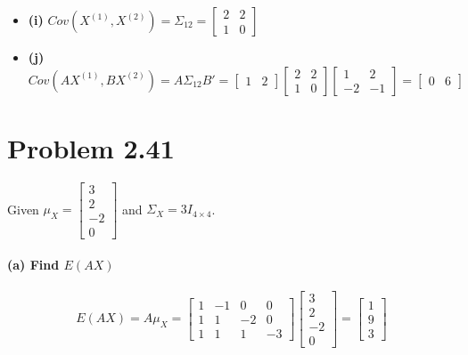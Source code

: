 \documentclass[12pt]{article}
\begin{document}
\begin{itemize}
    \item \textbf{(i)} $Cov(X^{(1)}, X^{(2)}) = \Sigma_{12} = \begin{bmatrix} 2 & 2 \\ 1 & 0 \end{bmatrix}$ 
    \item \textbf{(j)} $Cov(AX^{(1)}, BX^{(2)}) = A\Sigma_{12}B' = \begin{bmatrix} 1 & 2 \end{bmatrix} \begin{bmatrix} 2 & 2 \\ 1 & 0 \end{bmatrix} \begin{bmatrix} 1 & 2 \\ -2 & -1 \end{bmatrix} = \begin{bmatrix} 0 & 6 \end{bmatrix}$ 
\end{itemize}

\section*{Problem 2.41} 
Given $\mu_X = \begin{bmatrix} 3 \\ 2 \\ -2 \\ 0 \end{bmatrix}$ and $\Sigma_X = 3I_{4 \times 4}$. 

\paragraph{(a) Find $E(AX)$} 
\[
E(AX) = A\mu_X = \begin{bmatrix} 1 & -1 & 0 & 0 \\ 1 & 1 & -2 & 0 \\ 1 & 1 & 1 & -3 \end{bmatrix} \begin{bmatrix} 3 \\ 2 \\ -2 \\ 0 \end{bmatrix} = \begin{bmatrix} 1 \\ 9 \\ 3 \end{bmatrix}
\] 
\end{document}
